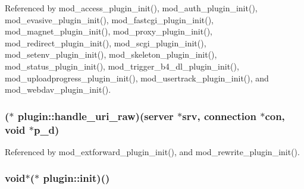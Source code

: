 Referenced by mod\-\_\-access\-\_\-plugin\-\_\-init(), mod\-\_\-auth\-\_\-plugin\-\_\-init(), mod\-\_\-evasive\-\_\-plugin\-\_\-init(), mod\-\_\-fastcgi\-\_\-plugin\-\_\-init(), mod\-\_\-magnet\-\_\-plugin\-\_\-init(), mod\-\_\-proxy\-\_\-plugin\-\_\-init(), mod\-\_\-redirect\-\_\-plugin\-\_\-init(), mod\-\_\-scgi\-\_\-plugin\-\_\-init(), mod\-\_\-setenv\-\_\-plugin\-\_\-init(), mod\-\_\-skeleton\-\_\-plugin\-\_\-init(), mod\-\_\-status\-\_\-plugin\-\_\-init(), mod\-\_\-trigger\-\_\-b4\-\_\-dl\-\_\-plugin\-\_\-init(), mod\-\_\-uploadprogress\-\_\-plugin\-\_\-init(), mod\-\_\-usertrack\-\_\-plugin\-\_\-init(), and mod\-\_\-webdav\-\_\-plugin\-\_\-init().

\hypertarget{structplugin_ae798106278e8cd7e7241b1f1ee9ac914}{
\subsubsection[{handle\-\_\-uri\-\_\-raw}]{($\ast$  plugin\-::handle\-\_\-uri\-\_\-raw)({\bf server} $\ast$srv, {\bf connection} $\ast$con, void $\ast$p\-\_\-d)}}\label{structplugin_ae798106278e8cd7e7241b1f1ee9ac914}


Referenced by mod\-\_\-extforward\-\_\-plugin\-\_\-init(), and mod\-\_\-rewrite\-\_\-plugin\-\_\-init().

\hypertarget{structplugin_a4cc5013e8cbed0a0d60337960674a1a4}{
\subsubsection[{init}]{\setlength{\rightskip}{0pt plus 5cm}void$\ast$($\ast$  plugin\-::init)()}}\label{structplugin_a4cc5013e8cbed0a0d60337960674a1a4}


